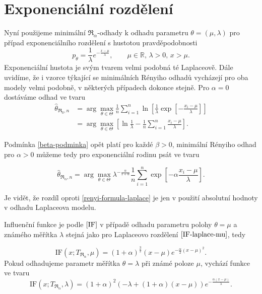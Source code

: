 \section{Exponenciální rozdělení} %

Nyní použijeme minimální $\mathfrak{R}_\alpha$-odhady k odhadu parametru $\theta = (\mu,\lambda)$ pro případ exponenciálního rozdělení s hustotou pravděpodobnosti
\begin{equation}
	p_\theta = \frac{1}{\lambda} e^{-\frac{x-\mu}{\lambda}}, \qquad \mu\in \mathbb{R},\, \lambda>0, \, x>\mu.
\end{equation}
\noindent Exponenciální hustota je svým tvarem velmi podobná té Laplaceově. Dále uvidíme, že i vzorce týkající se minimálních Rényiho odhadů vycházejí pro oba modely velmi podobně, v některých případech dokonce stejně.  Pro $\alpha = 0$ dostáváme odhad ve tvaru
\begin{align}
	\hat{\theta}_{\mathfrak{R}_0,n} & =  \arg \max_{\theta \in \Theta} \frac{1}{n} \sum^n_{i=1} \ln \left[ \frac{1}{\lambda}\exp \left[-\frac{x_i-\mu}{\lambda} \right] \right] \nonumber \\
	& =  \arg \max_{\theta \in \Theta} \left[ \ln \frac{1}{\lambda} - \frac{1}{n} \sum^n_{i=1} \frac{x_i-\mu}{\lambda} \right].
\end{align}

\noindent Podmínka \ref{beta-podminka} opět platí pro každé $\beta>0$, minimální Rényiho odhad pro $\alpha>0$ můžeme tedy pro exponenciální rodinu psát ve tvaru

\begin{equation}
	\hat{\theta}_{\mathfrak{R}_\alpha,n} = \arg \max_{\theta \in \Theta} \lambda^{-\frac{\alpha}{1+\alpha}} \frac{1}{n}\sum_{i=1}^n \exp \left[-\alpha\frac{x_i-\mu}{\lambda} \right].
	\label{renyi-formula-exponential}
\end{equation}

\noindent Je vidět, že rozdíl oproti \eqref{renyi-formula-laplace} je jen v použití absolutní hodnoty v odhadu Laplaceova modelu. 

Influenční funkce je podle $\eqref{IF}$ v případě odhadu parametru polohy $\theta = \mu$ a známého měřítka $ \lambda$ stejná jako pro Laplaceovo rozdělení $\eqref{IF-laplace-mu}$, tedy 

\begin{equation}
	\mathrm{IF}(x;T_{\mathfrak{R}_\alpha},\mu) = (1+\alpha )^{\frac{3}{2}} (x-\mu )  e^{-\frac{\alpha}{2} (x-\mu )^2}. %
	\label{IF-exponential-mu}
\end{equation}
Pokud odhadujeme parametr měřítka $\theta = \lambda$ při známé poloze $ \mu $, vychází funkce ve tvaru
\begin{equation}
	\mathrm{IF}(x;T_{\mathfrak{R}_\alpha},\lambda) =	(1+\alpha )^2 \left( - \lambda +(1+ \alpha)(x-\mu)\right) e^{-\frac{\alpha (x-\mu)}{\lambda }}. %
	\label{IF-exponential-lambda}
\end{equation}

